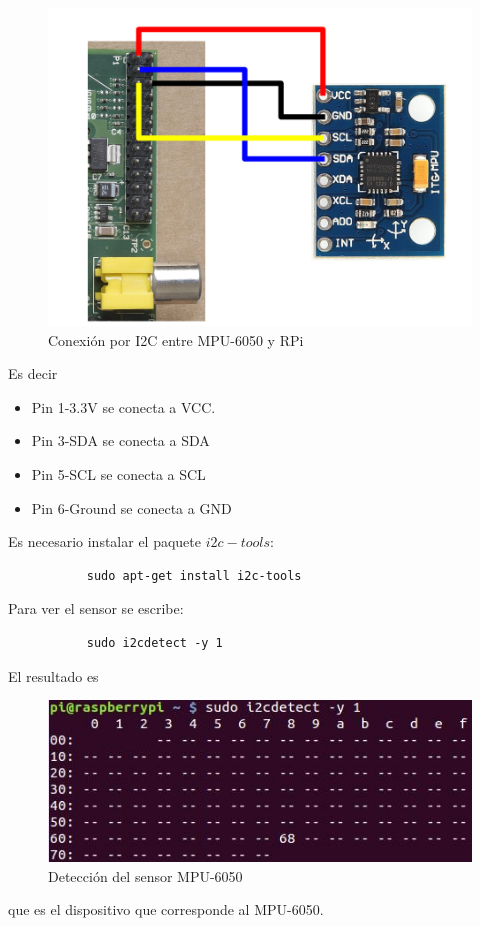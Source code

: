 \documentclass[twoside,11pt]{report}
\begin{document}
\begin{figure}[h!]
\begin{center}
\includegraphics[scale=0.2,viewport=0 200 800 720,clip]{images/ConSens.jpg}
\caption{Conexión por I2C entre MPU-6050 y RPi}
\end{center}
\end{figure}


Es decir
\begin{itemize}
\item Pin 1-3.3V se conecta a VCC.
\item Pin 3-SDA se conecta a SDA
\item Pin 5-SCL se conecta a SCL
\item Pin 6-Ground se conecta a GND
\end{itemize} 
Es necesario instalar el paquete $i2c-tools$:
\begin{verbatim}
           sudo apt-get install i2c-tools
\end{verbatim}
Para ver el sensor se escribe:
\begin{verbatim}
           sudo i2cdetect -y 1
\end{verbatim}
El resultado es 

\begin{figure}[h!]
\begin{center}
\includegraphics[scale=0.7]{images/i2cdetect.jpg}
\caption{Detección del sensor MPU-6050}
\end{center}
\end{figure}
que es el dispositivo que corresponde al MPU-6050.
\end{document}
